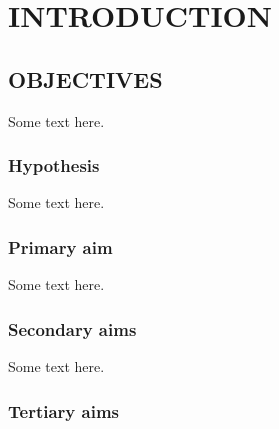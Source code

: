 \section{INTRODUCTION}
\vspace{1em}
\subsection{OBJECTIVES}
Some text here.
\subsubsection*{Hypothesis}
Some text here.
\subsubsection*{Primary aim}
Some text here.
\subsubsection*{Secondary aims}
Some text here.
\subsubsection*{Tertiary aims}
